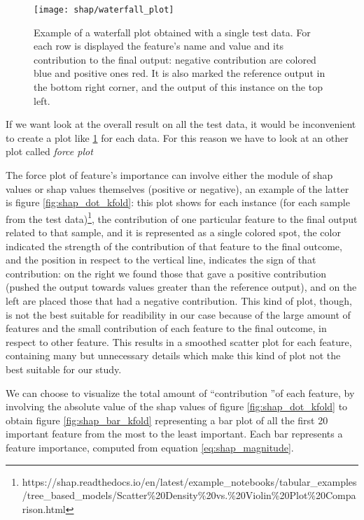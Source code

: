 \documentclass[10pt]{report}
\begin{document}
\begin{figure}[h]
\centering
\texttt{[image: shap/waterfall\_plot]}
\caption{Example of a waterfall plot obtained with a single test data. For each row is displayed the feature's name and value and its contribution to the final output: negative contribution are colored blue and positive ones red. It is also marked the reference output in the bottom right corner, and the output of this instance on the top left.
}\label{fig:shap_waterfall}
\end{figure}


If we want look at the overall result on all the test data, it would be inconvenient to create a plot like \ref{fig:shap_waterfall} for each data. For this reason we have to look at an other plot called \emph{force plot}

The force plot of feature's importance can involve either the module of shap values or shap values themselves (positive or negative), an example of the latter is figure \ref{fig:shap_dot_kfold}: this plot shows for each instance (for each sample from the test data)\footnote{https://shap.readthedocs.io/en/latest/example\_notebooks/tabular\_examples/tree\_based\_models/Scatter\%20Density\%20vs.\%20Violin\%20Plot\%20Comparison.html}, the contribution of one particular feature to the final output related to that sample, and it is represented as a single colored spot, the color indicated the strength of the contribution of that feature to the final outcome, and the position in respect to the vertical line, indicates the sign of that contribution: on the right we found those that gave a positive contribution (pushed the output towards values greater than the reference output), and on the left are placed those that had a negative contribution.
This kind of plot, though, is not the best suitable for readibility in our case because of the large amount of features and the small contribution of each feature to the final outcome, in respect to other feature.
This results in a smoothed scatter plot for each feature, containing many but unnecessary details which make this kind of plot not the best suitable for our study.

We can choose to visualize the total amount of \textquotedblleft contribution \textquotedblright of each feature, by involving the absolute value of the shap values of figure \ref{fig:shap_dot_kfold} to obtain figure \ref{fig:shap_bar_kfold} representing a bar plot of all the first 20 important feature from the most to the least important.
Each bar represents a feature importance, computed from equation \ref{eq:shap_magnitude}.
\end{document}
